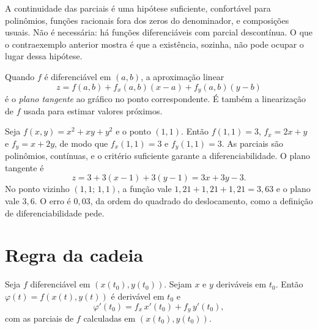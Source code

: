 \documentclass[11pt,a4paper]{article}
\begin{document}
A continuidade das parciais é uma hipótese suficiente, confortável para polinômios, funções racionais fora dos zeros do denominador, e composições usuais. Não é necessária: há funções diferenciáveis com parcial descontínua. O que o contraexemplo anterior mostra é que a existência, sozinha, não pode ocupar o lugar dessa hipótese.

Quando $f$ é diferenciável em $(a,b)$, a aproximação linear
\begin{equation}
z=f(a,b)+f_x(a,b)(x-a)+f_y(a,b)(y-b)
\label{eq:plano}
\end{equation}
é o \emph{plano tangente} ao gráfico no ponto correspondente. É também a linearização de $f$ usada para estimar valores próximos.

\begin{exemplo}
Seja $f(x,y)=x^2+xy+y^2$ e o ponto $(1,1)$. Então $f(1,1)=3$, $f_x=2x+y$ e $f_y=x+2y$, de modo que $f_x(1,1)=3$ e $f_y(1,1)=3$. As parciais são polinômios, contínuas, e o critério suficiente garante a diferenciabilidade. O plano tangente é
\[
z=3+3(x-1)+3(y-1)=3x+3y-3.
\]
No ponto vizinho $(1{,}1;\,1{,}1)$, a função vale $1{,}21+1{,}21+1{,}21=3{,}63$ e o plano vale $3{,}6$. O erro é $0{,}03$, da ordem do quadrado do deslocamento, como a definição de diferenciabilidade pede.
\end{exemplo}

\section{Regra da cadeia}

\begin{teorema}
Seja $f$ diferenciável em $(x(t_0),y(t_0))$. Sejam $x$ e $y$ deriváveis em $t_0$. Então $\varphi(t)=f(x(t),y(t))$ é derivável em $t_0$ e
\[
\varphi'(t_0)=f_x\,x'(t_0)+f_y\,y'(t_0),
\]
com as parciais de $f$ calculadas em $(x(t_0),y(t_0))$.
\end{teorema}
\end{document}
